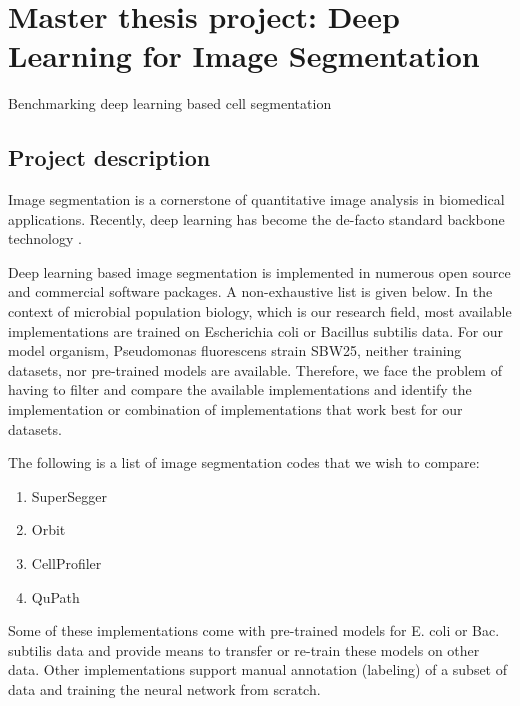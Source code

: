 \documentclass[a4paper]{article}
\begin{document}
\section{Master thesis project: Deep Learning for Image Segmentation\label{dlsegbench}}

Benchmarking deep learning based cell segmentation

\subsection{Project description}\label{project-description}

Image segmentation is a cornerstone of quantitative image analysis in
biomedical applications. Recently, deep learning \cite{Aggarwal2018} has become the de-facto
standard backbone technology \cite{Valen2016}. 

Deep learning based image segmentation is implemented in numerous open
source and commercial software packages. A non-exhaustive list is given below.
In the context of microbial
population biology, which is our research field, most available
implementations are trained on Escherichia coli or Bacillus subtilis
data. For our model organism, Pseudomonas fluorescens strain SBW25,
neither training datasets, nor pre-trained models are available.
Therefore, we face the problem of having to filter and compare the available implementations and
identify the implementation or combination of implementations that work best for our datasets. 

The following is a list of image segmentation codes that we wish to
compare:

\begin{enumerate}
    \def\labelenumi{\arabic{enumi}.}
    \item
        SuperSegger \cite{Stylianidou2016}
    \item
        Orbit \cite{Stritt2020}
    \item
        CellProfiler \cite{Jones2008}
    \item
        QuPath \cite{Bankhead2017}
\end{enumerate}

Some of these implementations come with pre-trained models for E. coli or Bac. subtilis data and provide means to
transfer or re-train these models on other data. Other implementations support manual annotation (labeling) of a subset of data and training the neural network from scratch.
\end{document}
